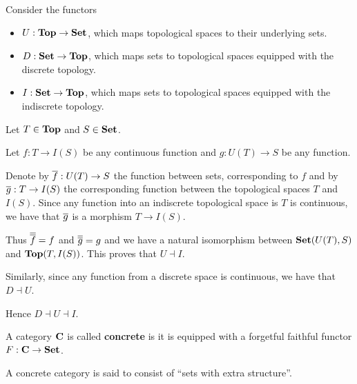\begin{example}\label{ex:top_adjoint_functor}\cite[example 2.1.5]{Leinster2014}
  Consider the functors
  \begin{itemize}
    \item \( U: \operatorname{\mathbf{Top}} \to \operatorname{\mathbf{Set}} \), which maps topological spaces to their underlying sets.
    \item \( D: \operatorname{\mathbf{Set}} \to \operatorname{\mathbf{Top}} \), which maps sets to topological spaces equipped with the discrete topology.
    \item \( I: \operatorname{\mathbf{Set}} \to \operatorname{\mathbf{Top}} \), which maps sets to topological spaces equipped with the indiscrete topology.
  \end{itemize}

  Let \( T \in \operatorname{\mathbf{Top}} \) and \( S \in \operatorname{\mathbf{Set}} \).

  Let \( f: T \to I(S) \) be any continuous function and \( g: U(T) \to S \) be any function.

  Denote by \( \overline{f}: U(T) \to S \) the function between sets, corresponding to \( f \) and by \( \overline{g}: T \to I(S) \) the corresponding function between the topological spaces \( T \) and \( I(S) \). Since any function into an indiscrete topological space is \( T \) is continuous, we have that \( \overline{g} \) is a morphism \( T \to I(S) \).

  Thus \( \overline{\overline{f}} = f \) and \( \overline{\overline{g}} = g \) and we have a natural isomorphism between \( \operatorname{\mathbf{Set}}(U(T), S) \) and \( \operatorname{\mathbf{Top}}(T, I(S)) \). This proves that \( U \dashv I \).

  Similarly, since any function from a discrete space is continuous, we have that \( D \dashv U \).

  Hence \( D \dashv U \dashv I \).
\end{example}

\begin{definition}\label{def:concrete_category}
  A category \( \operatorname{\mathbf{C}} \) is called \textbf{concrete} is it is equipped with a forgetful faithful functor \( F: \operatorname{\mathbf{C}} \to \operatorname{\mathbf{Set}} \).

  A concrete category is said to consist of \enquote{sets with extra structure}.
\end{definition}


